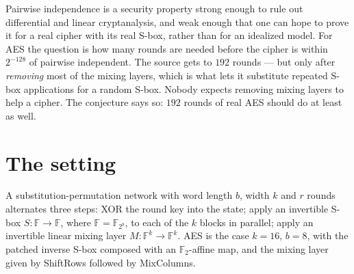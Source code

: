 \documentclass{aicr-conjecture}
\begin{document}

\vspace{0.4em}

\begin{informalconjecture}
Pairwise independence is a security property strong enough to rule out
differential and linear cryptanalysis, and weak enough that one can hope
to prove it for a real cipher with its real S-box, rather than for an
idealized model. For AES the question is how many rounds are needed
before the cipher is within $2^{-128}$ of pairwise independent. The
source gets to $192$ rounds --- but only after \emph{removing} most of the
mixing layers, which is what lets it substitute repeated S-box
applications for a random S-box. Nobody expects removing mixing layers to
help a cipher. The conjecture says so: $192$ rounds of real AES should do
at least as well.
\end{informalconjecture}

\section{The setting}\label{sec:setting}

A substitution-permutation network with word length $b$, width $k$ and
$r$ rounds alternates three steps: XOR the round key into the state;
apply an invertible S-box $S : \mathbb{F} \to \mathbb{F}$, where
$\mathbb{F} = \mathbb{F}_{2^{b}}$, to each of the $k$ blocks in parallel;
apply an invertible linear mixing layer $M : \mathbb{F}^{k} \to
\mathbb{F}^{k}$. AES is the case $k = 16$, $b = 8$, with the patched
inverse S-box composed with an $\mathbb{F}_{2}$-affine map, and the
mixing layer given by ShiftRows followed by MixColumns.
\end{document}
